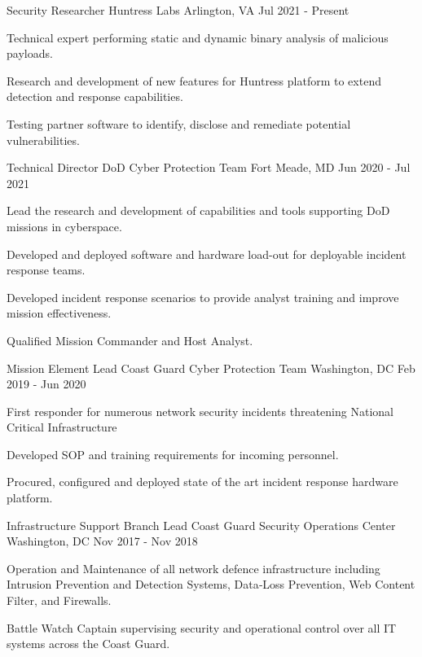 \documentclass[11pt, letterpaper]{awesome-cv}
\begin{document}
\begin{cventries}


  \cventry
    {Security Researcher}
    {Huntress Labs}
    {Arlington, VA}
    {Jul 2021 - Present}
    {
      \begin{cvitems}
        \item{Technical expert performing static and dynamic binary analysis of malicious payloads.}
        \item{Research and development of new features for Huntress platform to extend detection and response capabilities.}
        \item{Testing partner software to identify, disclose and remediate potential vulnerabilities.}
      \end{cvitems}
    }


  \cventry
    {Technical Director}
    {DoD Cyber Protection Team}
    {Fort Meade, MD}
    {Jun 2020 - Jul 2021}
    {
      \begin{cvitems}
        \item{Lead the research and development of capabilities and tools supporting DoD missions in cyberspace.}
        \item{Developed and deployed software and hardware load-out for deployable incident response teams.}
        \item{Developed incident response scenarios to provide analyst training and improve mission effectiveness.}
        \item{Qualified Mission Commander and Host Analyst.}
      \end{cvitems}
    }


  \cventry
    {Mission Element Lead}
    {Coast Guard Cyber Protection Team}
    {Washington, DC}
    {Feb 2019 - Jun 2020}
    {
      \begin{cvitems}
        \item{First responder for numerous network security incidents threatening National Critical Infrastructure}
        \item{Developed SOP and training requirements for incoming personnel.}
        \item{Procured, configured and deployed state of the art incident response hardware platform.}
      \end{cvitems}
    }


  \cventry
    {Infrastructure Support Branch Lead}
    {Coast Guard Security Operations Center}
    {Washington, DC}
    {Nov 2017 - Nov 2018}
    {
      \begin{cvitems}
        \item{Operation and Maintenance of all network defence infrastructure including Intrusion Prevention and Detection Systems, Data‑Loss Prevention, Web Content Filter, and Firewalls.}
        \item{Battle Watch Captain supervising security and operational control over all IT systems across the Coast Guard.}
      \end{cvitems}
    }



\end{cventries}
\end{document}
